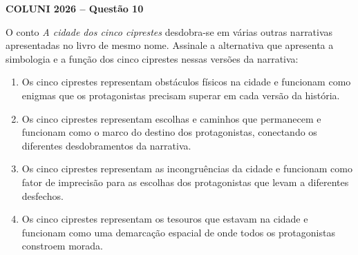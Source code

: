 \textbf{COLUNI 2026 -- Questão 10}\par\medskip O conto \textit{A cidade dos cinco ciprestes} desdobra-se em várias outras narrativas apresentadas no livro de mesmo nome. Assinale a alternativa que apresenta a simbologia e a função dos cinco ciprestes nessas versões da narrativa:
\begin{enumerate}
\item Os cinco ciprestes representam obstáculos físicos na cidade e funcionam como enigmas que os protagonistas precisam superar em cada versão da história.
\item Os cinco ciprestes representam escolhas e caminhos que permanecem e funcionam como o marco do destino dos protagonistas, conectando os diferentes desdobramentos da narrativa.
\item Os cinco ciprestes representam as incongruências da cidade e funcionam como fator de imprecisão para as escolhas dos protagonistas que levam a diferentes desfechos.
\item Os cinco ciprestes representam os tesouros que estavam na cidade e funcionam como uma demarcação espacial de onde todos os protagonistas constroem morada.
\end{enumerate}
